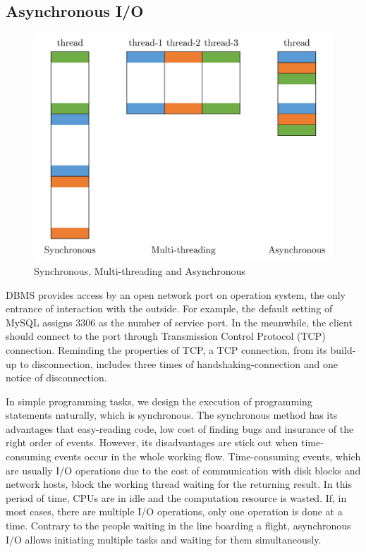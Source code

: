 \documentclass[onecolumn, conference, 12pt]{IEEEtran}
\begin{document}
	\subsection{Asynchronous I/O}
	\begin{figure}[!t]
		\centering
		\includegraphics[width=4.5in]{fig/sma.png}
		\caption{Synchronous, Multi-threading and Asynchronous}
		\label{fig_sma}
	\end{figure}
	DBMS provides access by an open network port on operation system, the only entrance of interaction with the outside. For example, the default setting of MySQL assigns $3306$ as the number of service port. In the meanwhile, the client should connect to the port through Transmission Control Protocol (TCP) connection. Reminding the properties of TCP, a TCP connection, from its build-up to disconnection, includes three times of handshaking-connection and one notice of disconnection. 
	
	In simple programming tasks, we design the execution of programming statements naturally, which is synchronous. The synchronous method has its advantages that easy-reading code, low cost of finding bugs and insurance of the right order of events. However, its disadvantages are stick out when time-consuming events occur in the whole working flow. Time-consuming events, which are usually I/O operations due to the cost of communication with disk blocks and network hosts, block the working thread waiting for the returning result. In this period of time, CPUs are in idle and the computation resource is wasted. If, in most cases, there are multiple I/O operations, only one operation is done at a time. Contrary to the people waiting in the line boarding a flight, asynchronous I/O allows initiating multiple tasks and waiting for them simultaneously.
	
\end{document}
